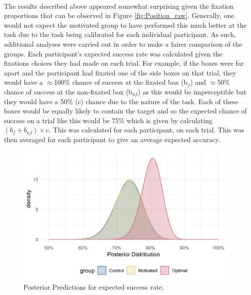 \documentclass[12pt]{article}
\begin{document}
\paragraph{} The results described above appeared somewhat surprising given the fixation proportions that can be observed in Figure \ref{fig:Position_raw}. Generally, one would not expect the motivated group to have performed this much better at the task due to the task being calibrated for each individual participant. As such, additional analyses were carried out in order to make a fairer comparison of the groups. Each participant's expected success rate was calculated given the fixations choices they had made on each trial. For example, if the boxes were far apart and the participant had fixated one of the side boxes on that trial, they would have a $\approx$100\% chance of success at the fixated box (b$_f$) and $\approx$50\% chance of success at the non-fixated box (b$_{nf}$) as this would be imperceptible but they would have a 50\% ($c$) chance due to the nature of the task. Each of these boxes would be equally likely to contain the target and so the expected chance of success on a trial like this would be 75\% which is given by calculating $(b_f + b_{nf})\times c$. This was calculated for each participant, on each trial. This was then averaged for each participant to give an average expected accuracy. 

\begin{figure}[ht!]
	\includegraphics[scale=1]{../Figures/Model_stan_expacc.png}
	\centering
	\captionsetup{justification=centering}
	\caption{Posterior Predictions for expected success rate.}
	\label{fig:Model_exp_acc}
\end{figure}
\end{document}
